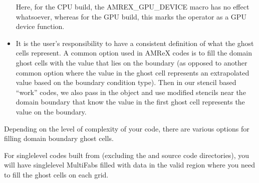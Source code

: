 \documentclass[letterpaper,10pt,english]{sphinxmanual}
\begin{document}
\begin{itemize}
\sphinxAtStartPar
Here, for the CPU build, the AMREX\_GPU\_DEVICE macro has no effect
whatsoever, whereas for the GPU build, this marks the operator as a GPU
device function.

\item {} 
\sphinxAtStartPar
It is the user’s responsibility to have a consistent definition of
what the ghost cells represent. A common option used in AMReX codes is to
fill the domain ghost cells with the value that lies on the boundary (as
opposed to another common option where the value in the ghost cell represents
an extrapolated value based on the boundary condition type). Then in our
stencil based “work” codes, we also pass in the  object and use
modified stencils near the domain boundary that know the value in the first
ghost cell represents the value on the boundary.

\end{itemize}

\sphinxAtStartPar
Depending on the level of complexity of your code, there are various options
for filling domain boundary ghost cells.

\sphinxAtStartPar
For single\sphinxhyphen{}level codes built from  (excluding the
 and  source code directories), you will
have single\sphinxhyphen{}level MultiFabs filled with data in the valid region where you need
to fill the ghost cells on each grid.

\begin{sphinxVerbatim}[commandchars=\\\{\}]
 
 
 
 



   
     
        
         
\end{sphinxVerbatim}
\end{document}
